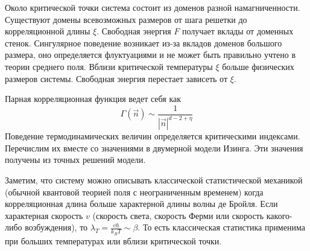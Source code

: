 \documentclass[a4paper,12pt]{article}
\theoremstyle{definition}
\theoremstyle{definition}
\theoremstyle{definition}
\begin{document}
Около критической точки система состоит из доменов разной намагниченности. Существуют домены
всевозможных размеров от шага решетки до корреляционной длины $\xi$. Свободная энергия $F$ получает
вклады от доменных стенок. Сингулярное поведение возникает из-за вкладов доменов большого размера,
оно определяется флуктуациями и не может быть правильно учтено в теории среднего поля. Вблизи
критической температуры $\xi$ больше физических размеров системы. Свободная энергия перестает
зависеть от $\xi$.  

Парная корреляционная функция ведет себя как
\begin{equation}
  \label{eq:32}
  \Gamma(\vec n)\sim \frac{1}{\left|\vec n\right|^{d-2+\eta}}
\end{equation}
Поведение термодинамических величин определяется критическими индексами. Перечислим их вместе со
значениями в двумерной модели Изинга. Эти значения получены из точных решений модели. 
\begin{table}[h!tb]
\label{tab:diagrams}
\noindent  {}
\end{table}

Заметим, что систему можно описывать классической статистической механикой (обычной квантовой
теорией поля с неограниченным временем) когда корреляционная длина больше характерной длины волны де
Бройля. Если характерная скорость $v$ (скорость света, скорость Ферми или скорость какого-либо
возбуждения), то $\lambda_T=\frac{v\hbar}{k_B T}\sim \beta$. То есть классическая статистика
применима при больших температурах или вблизи критической точки. %
\end{document}
